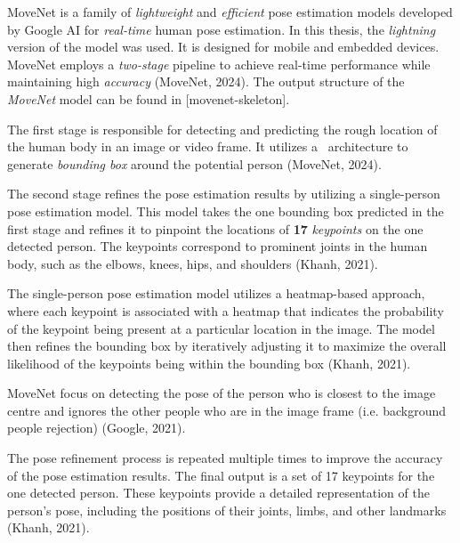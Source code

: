 
MoveNet is a family of {\em lightweight} and {\em efficient} pose estimation models developed by Google AI for {\em real-time} human pose estimation. In this thesis, the {\em lightning} version of the model was used. It is designed for mobile and embedded devices. MoveNet employs a {\em two-stage} pipeline to achieve real-time performance while maintaining high {\em accuracy} (\scc MoveNet, 2024). The output structure of the {\em MoveNet} model can be found in [movenet-skeleton].

The first stage is responsible for detecting and predicting the rough location of the human body in an image or video frame. It utilizes a \SSD\ architecture to generate {\em bounding box} around the potential person (\scc MoveNet, 2024).

The second stage refines the pose estimation results by utilizing a single-person pose estimation model. This model takes the one bounding box predicted in the first stage and refines it to pinpoint the locations of {\bf 17} {\em keypoints} on the one detected person. The keypoints correspond to prominent joints in the human body, such as the elbows, knees, hips, and shoulders (\scc Khanh, 2021).

The single-person pose estimation model utilizes a heatmap-based approach, where each keypoint is associated with a heatmap that indicates the probability of the keypoint being present at a particular location in the image. The model then refines the bounding box by iteratively adjusting it to maximize the overall likelihood of the keypoints being within the bounding box (\scc Khanh, 2021).

MoveNet focus on detecting the pose of the person who is closest to the image centre and ignores the other people who are in the image frame (i.e. background people rejection) (\scc Google, 2021).

The pose refinement process is repeated multiple times to improve the accuracy of the pose estimation results. The final output is a set of 17 keypoints for the one detected person. These keypoints provide a detailed representation of the person's pose, including the positions of their joints, limbs, and other landmarks (\scc Khanh, 2021).

